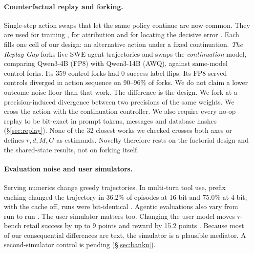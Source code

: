 \paragraph{Counterfactual replay and forking.} Single-step action swaps that let the same policy continue are now common. They are used for training \citep{li2026cso,li2026crr}, for attribution \citep{shah2026car} and for locating the decisive error \citep{zhang2025agentracer}. Each fills one cell of our design: an alternative action under a fixed continuation. \emph{The Replay Gap} \citep{gonuguntla2026replay} forks live SWE-agent trajectories and swaps the \emph{continuation} model, comparing Qwen3-4B (FP8) with Qwen3-14B (AWQ), against same-model control forks. Its 359 control forks had 0 success-label flips. Its FP8-served controls diverged in action sequence on 90--96\% of forks. %
We do not claim a lower outcome noise floor than that work. The difference is the design. We fork at a precision-induced divergence between two precisions of the same weights. We cross the action with the continuation controller. We also require every no-op replay to be bit-exact in prompt tokens, messages and database hashes (\S\ref{sec:replay}). None of the 32 closest works we checked crosses both axes or defines $r,d,M,G$ as estimands. Novelty therefore rests on the factorial design and the shared-state results, not on forking itself.

\paragraph{Evaluation noise and user simulators.} Serving numerics change greedy trajectories. In multi-turn tool use, prefix caching changed the trajectory in 36.2\% of episodes at 16-bit and 75.0\% at 4-bit; with the cache off, runs were bit-identical \citep{patodiya2026same}. %
Agentic evaluations also vary from run to run \citep{bjarnason2026randomness,chen2026noisefloor}. The user simulator matters too. Changing the user model moves $\tau$-bench retail success by up to 9 points \citep{seshadri2026lost} and reward by 15.2 points \citep{jain2026userproxybench}. %
Because most of our consequential differences are text, the simulator is a plausible mediator. A second-simulator control is pending (\S\ref{sec:banku}).
